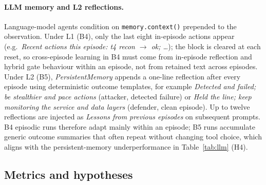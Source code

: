 \paragraph{LLM memory and L2 reflections.}
Language-model agents condition on \texttt{memory.context()} prepended to the
observation. Under L1 (B4), only the last eight in-episode actions appear
(e.g.\ \emph{Recent actions this episode: t4 recon $\to$ ok; \dots}); the
block is cleared at each reset, so cross-episode learning in B4 must come from
in-episode reflection and hybrid gate behaviour within an episode, not from
retained text across episodes. Under L2
(B5), \emph{PersistentMemory} appends a one-line reflection after every episode
using deterministic outcome templates, for example \emph{Detected and failed; be
stealthier and pace actions} (attacker, detected failure) or \emph{Held the line;
keep monitoring the service and data layers} (defender, clean episode). Up to
twelve reflections are injected as \emph{Lessons from previous episodes} on
subsequent prompts. B4 episodic runs therefore adapt mainly within an episode;
B5 runs accumulate generic outcome summaries that often repeat without changing
tool choice, which aligns with the persistent-memory underperformance in
Table~\ref{tab:llm} (H4).

\subsection{Metrics and hypotheses}
\label{sec:method-metrics}

